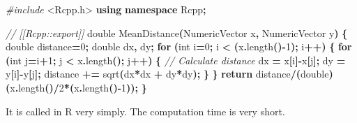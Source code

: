 \documentclass[
  12pt,
  american,
  a4paper,
  extrafontsizes,onecolumn,openright
  ]{memoir}
\newenvironment{Shaded}{\begin{snugshade}}{\end{snugshade}}
\newcommand{\CommentTok}[1]{\textcolor[rgb]{0.56,0.35,0.01}{\textit{#1}}}
\newcommand{\ControlFlowTok}[1]{\textcolor[rgb]{0.13,0.29,0.53}{\textbf{#1}}}
\newcommand{\DataTypeTok}[1]{\textcolor[rgb]{0.13,0.29,0.53}{#1}}
\newcommand{\DecValTok}[1]{\textcolor[rgb]{0.00,0.00,0.81}{#1}}
\newcommand{\FunctionTok}[1]{\textcolor[rgb]{0.00,0.00,0.00}{#1}}
\newcommand{\ImportTok}[1]{#1}
\newcommand{\KeywordTok}[1]{\textcolor[rgb]{0.13,0.29,0.53}{\textbf{#1}}}
\newcommand{\NormalTok}[1]{#1}
\newcommand{\OperatorTok}[1]{\textcolor[rgb]{0.81,0.36,0.00}{\textbf{#1}}}
\newcommand{\OtherTok}[1]{\textcolor[rgb]{0.56,0.35,0.01}{#1}}
\newcommand{\PreprocessorTok}[1]{\textcolor[rgb]{0.56,0.35,0.01}{\textit{#1}}}
\newcommand{\SpecialCharTok}[1]{\textcolor[rgb]{0.00,0.00,0.00}{#1}}
\newlength{\rf}
\begin{document}
\begin{Shaded}
\begin{Highlighting}[]
\PreprocessorTok{\#include }\ImportTok{\textless{}Rcpp.h\textgreater{}}
\KeywordTok{using} \KeywordTok{namespace}\NormalTok{ Rcpp}\OperatorTok{;}

\CommentTok{// [[Rcpp::export]]}
\DataTypeTok{double}\NormalTok{ MeanDistance}\OperatorTok{(}\NormalTok{NumericVector x}\OperatorTok{,}\NormalTok{ NumericVector y}\OperatorTok{)} \OperatorTok{\{}
  \DataTypeTok{double}\NormalTok{ distance}\OperatorTok{=}\DecValTok{0}\OperatorTok{;}
  \DataTypeTok{double}\NormalTok{ dx}\OperatorTok{,}\NormalTok{ dy}\OperatorTok{;}
  \ControlFlowTok{for} \OperatorTok{(}\DataTypeTok{int}\NormalTok{ i}\OperatorTok{=}\DecValTok{0}\OperatorTok{;}\NormalTok{ i }\OperatorTok{\textless{}} \OperatorTok{(}\NormalTok{x}\OperatorTok{.}\NormalTok{length}\OperatorTok{(){-}}\DecValTok{1}\OperatorTok{);}\NormalTok{ i}\OperatorTok{++)} \OperatorTok{\{}
    \ControlFlowTok{for} \OperatorTok{(}\DataTypeTok{int}\NormalTok{ j}\OperatorTok{=}\NormalTok{i}\OperatorTok{+}\DecValTok{1}\OperatorTok{;}\NormalTok{ j }\OperatorTok{\textless{}}\NormalTok{ x}\OperatorTok{.}\NormalTok{length}\OperatorTok{();}\NormalTok{ j}\OperatorTok{++)} \OperatorTok{\{}
    \CommentTok{// Calculate distance}
\NormalTok{        dx }\OperatorTok{=}\NormalTok{ x}\OperatorTok{[}\NormalTok{i}\OperatorTok{]{-}}\NormalTok{x}\OperatorTok{[}\NormalTok{j}\OperatorTok{];}
\NormalTok{        dy }\OperatorTok{=}\NormalTok{ y}\OperatorTok{[}\NormalTok{i}\OperatorTok{]{-}}\NormalTok{y}\OperatorTok{[}\NormalTok{j}\OperatorTok{];}
\NormalTok{        distance }\OperatorTok{+=}\NormalTok{ sqrt}\OperatorTok{(}\NormalTok{dx}\OperatorTok{*}\NormalTok{dx }\OperatorTok{+}\NormalTok{ dy}\OperatorTok{*}\NormalTok{dy}\OperatorTok{);}
    \OperatorTok{\}}
  \OperatorTok{\}}
  \ControlFlowTok{return}\NormalTok{ distance}\OperatorTok{/(}\DataTypeTok{double}\OperatorTok{)(}\NormalTok{x}\OperatorTok{.}\NormalTok{length}\OperatorTok{()/}\DecValTok{2}\OperatorTok{*(}\NormalTok{x}\OperatorTok{.}\NormalTok{length}\OperatorTok{(){-}}\DecValTok{1}\OperatorTok{));}
\OperatorTok{\}}
\end{Highlighting}
\end{Shaded}

\normalsize

It is called in R very simply.
The computation time is very short.

\scriptsize

\begin{Shaded}
\end{Shaded}
\end{document}
